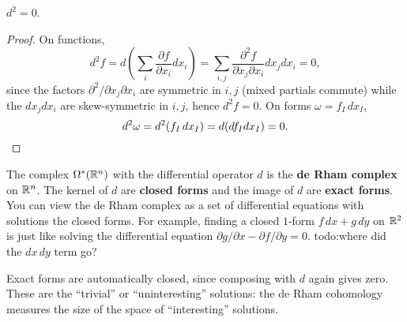 \begin{prop}
    $d^2=0$.
\end{prop}
\begin{proof}
    On functions, \[
        d^2f=d\left( \sum _i \frac{\partial f}{\partial x_i }dx_i  \right) =\sum _{i,j}\frac{\partial ^2f}{\partial x_j \partial x_i }dx_j dx_i =0,
    \] since the factors $\partial ^2 /\partial x_j  \partial x_i $ are symmetric in $i,j$ (mixed partials commute) while the $dx_j dx_i $ are skew-symmetric in $i,j$, hence $d^2f=0$. On forms $\omega=f_I\,dx_I$, \[
    d^2\omega =d^2(f_I\,dx_I)=d(df_Idx_I)=0.\qedhere
    \] 
\end{proof}
The complex $\Omega^*(\mathbb{R}^n )$ with the differential operator $d$ is the \textbf{de Rham complex} on $\mathbb{R}^n $. The kernel of $d$ are \textbf{closed forms} and the image of $d$ are \textbf{exact forms}. You can view the de Rham complex as a set of differential equations with solutions the closed forms. For example, finding a closed $1$-form $f\, dx+g\,dy$ on $\mathbb{R}^2$ is just like solving the differential equation $\partial g/\partial x-\partial f /\partial y=0$. {\color{red}todo:where did the $dx\, dy$ term go?} 

Exact forms are automatically closed, since composing with $d$ again gives zero. These are the ``trivial'' or ``uninteresting'' solutions: the de Rham cohomology measures the size of the space of ``interesting'' solutions.

